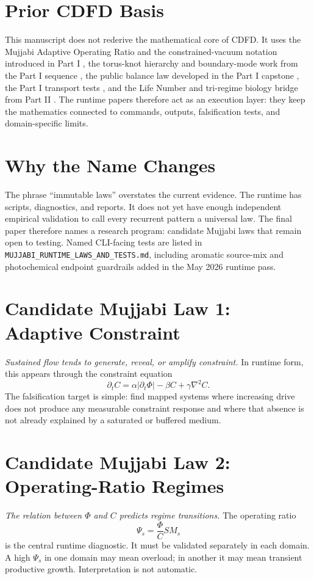 \documentclass[12pt,a4paper]{article}
\begin{document}
\section{Prior CDFD Basis}
This manuscript does not rederive the mathematical core of CDFD. It uses the
Mujjabi Adaptive Operating Ratio and the constrained-vacuum notation introduced
in Part I \cite{MujjabiI2026}, the torus-knot hierarchy and boundary-mode work
from the Part I sequence \cite{MujjabiVI2026,MujjabiIX2026}, the public balance
law developed in the Part I capstone \cite{MujjabiX2026}, the Part I transport
tests \cite{MujjabiXII2026}, and the Life Number and tri-regime biology bridge
from Part II \cite{MujjabiPartII2026}. The runtime papers therefore act as an
execution layer: they keep the mathematics connected to commands, outputs,
falsification tests, and domain-specific limits.


\section{Why the Name Changes}
The phrase ``immutable laws'' overstates the current evidence. The runtime has
scripts, diagnostics, and reports. It does not yet have enough independent
empirical validation to call every recurrent pattern a universal law. The final
paper therefore names a research program: candidate Mujjabi laws that remain open
to testing. Named CLI-facing tests are listed in
\texttt{MUJJABI\_RUNTIME\_LAWS\_AND\_TESTS.md}, including aromatic source-mix and
photochemical endpoint guardrails added in the May 2026 runtime pass.

\section{Candidate Mujjabi Law 1: Adaptive Constraint}
\textit{Sustained flow tends to generate, reveal, or amplify constraint.}
In runtime form, this appears through the constraint equation
\begin{equation}
    \partial_t C = \alpha|\partial_t \Phi|-\beta C+\gamma\nabla^2 C.
\end{equation}
The falsification target is simple: find mapped systems where increasing drive
does not produce any measurable constraint response and where that absence is
not already explained by a saturated or buffered medium.

\section{Candidate Mujjabi Law 2: Operating-Ratio Regimes}
\textit{The relation between $\Phi$ and $C$ predicts regime transitions.}
The operating ratio
\begin{equation}
    \Psi_s=\frac{\Phi}{C}S M_s
\end{equation}
is the central runtime diagnostic. It must be validated separately in each
domain. A high $\Psi_s$ in one domain may mean overload; in another it may mean
transient productive growth. Interpretation is not automatic.
\end{document}
